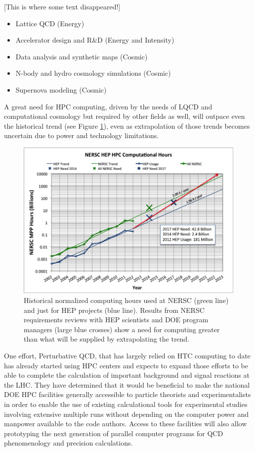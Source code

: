 [This is where some text disappeared!]

\begin{itemize}
\item Lattice QCD (Energy)
\item Accelerator design and R\&D (Energy and Intensity)
\item Data analysis and synthetic maps (Cosmic)
\item N-body and hydro cosmology simulations (Cosmic)
\item Supernova modeling (Cosmic)
\end{itemize}

A great need for HPC computing, driven by the needs of LQCD and computational cosmology but required by other fields as well, will outpace even the historical trend (see Figure \ref{fig:NERSC-Computational-Hours}), even as extrapolation of those trends becomes uncertain due to power and technology limitations.

\begin{figure}[h]
\includegraphics[width=\textwidth]{CpF-I2/images/2013-NERSC-Usage-HEP.png}
\caption{Historical normalized computing hours used at NERSC (green line) and just for HEP projects (blue line). Results from NERSC requirements reviews with HEP scientists and DOE program managers (large blue crosses) show a need for computing greater than what will be supplied by extrapolating the trend.}
\label{fig:NERSC-Computational-Hours}
\end{figure}


One effort, Perturbative QCD,  that has largely relied on HTC computing to date has already started using HPC centers and expects to 
expand those efforts to be able to complete the calculation of important background and signal reactions at the
LHC.  
They have determined that it would be beneficial to make the national DOE HPC
facilities 
generally accessible to particle theorists and
experimentalists in order to enable the use of existing
calculational tools for experimental studies involving extensive
multiple runs without depending on the computer power and manpower
available to the code authors. Access to these facilities will also
allow prototyping the next generation of parallel computer programs
for QCD phenomenology and precision calculations.


